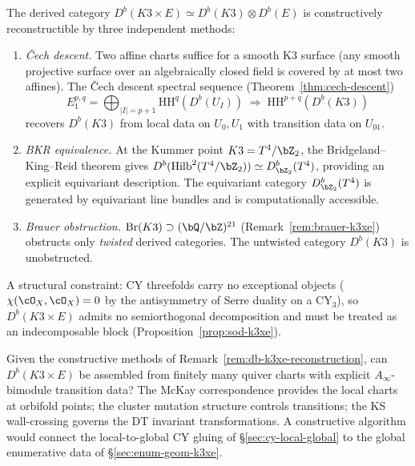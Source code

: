 \begin{remark}
\label{rem:db-k3xe-reconstruction}
The derived category $D^b(K3 \times E) \simeq D^b(K3) \otimes
D^b(E)$ is constructively reconstructible by three independent
methods:
\begin{enumerate}[label=\textup{(\roman*)}]
\item \emph{\v{C}ech descent.}
Two affine charts suffice for a smooth K3 surface
\textup{(}any smooth projective surface over an algebraically
closed field is covered by at most two affines\textup{)}.
The \v{C}ech descent spectral sequence
\textup{(}Theorem~\textup{\ref{thm:cech-descent})}
\[
E_1^{p,q} = \bigoplus_{|I|=p+1}
 \mathrm{HH}^q(D^b(U_I))
\;\Longrightarrow\;
\mathrm{HH}^{p+q}(D^b(K3))
\]
recovers $D^b(K3)$ from local data on $U_0, U_1$
with transition data on $U_{01}$.
\item \emph{BKR equivalence.}
At the Kummer point $K3 = T^4/\bZ_2$, the
Bridgeland--King--Reid theorem gives
$D^b(\operatorname{Hilb}^2(T^4/\bZ_2)) \simeq
D^b_{\bZ_2}(T^4)$, providing an explicit equivariant
description. The equivariant category
$D^b_{\bZ_2}(T^4)$ is generated by equivariant
line bundles and is computationally accessible.
\item \emph{Brauer obstruction.}
$\mathrm{Br}(K3) \supset (\bQ/\bZ)^{21}$
\textup{(}Remark~\textup{\ref{rem:brauer-k3xe})} obstructs
only \emph{twisted} derived categories. The
untwisted category $D^b(K3)$ is unobstructed.
\end{enumerate}
A structural constraint: CY threefolds carry no exceptional
objects \textup{(}$\chi(\cO_X, \cO_X) = 0$ by the
antisymmetry of Serre duality on a CY$_3$\textup{)}, so
$D^b(K3 \times E)$ admits no semiorthogonal decomposition
and must be treated as an indecomposable block
\textup{(}Proposition~\textup{\ref{prop:sod-k3xe})}.
\end{remark}

\begin{openproblem}
\label{op:global-cy-category}
Given the constructive methods of
Remark~\ref{rem:db-k3xe-reconstruction}, can
$D^b(K3 \times E)$ be assembled from finitely many quiver
charts with explicit $A_\infty$-bimodule transition data?
The McKay correspondence provides the local charts at
orbifold points; the cluster mutation structure controls
transitions; the KS wall-crossing governs the DT invariant
transformations. A constructive algorithm would connect the
local-to-global CY gluing of
\S\ref{sec:cy-local-global} to the global enumerative data of
\S\ref{sec:enum-geom-k3xe}.
\end{openproblem}


